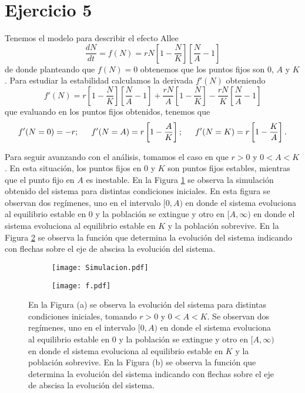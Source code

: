 \section*{Ejercicio 5}
\graphicspath{{Figuras/ej_06/}}

Tenemos el modelo para describir el efecto Allee
\begin{equation}
    \frac{dN}{dt} = f(N) = r N \left[ 1 - \frac{N}{K} \right] \left[ \frac{N}{A} -1 \right]
\end{equation}
de donde planteando que $f(N) = 0$ obtenemos que los puntos fijos son 0, $A$ y $K$. Para estudiar la estabilidad calculamos la derivada $f'(N)$ obteniendo
\begin{equation}
    f'(N) = r \left[ 1-\frac{N}{K} \right] \left[ \frac{N}{A} -1 \right] + \frac{rN}{A} \left[ 1 - \frac{N}{K} \right] - \frac{rN}{K} \left[ \frac{N}{A}-1\right]
\end{equation}
que evaluando en los puntos fijos obtenidos, tenemos que
\begin{equation}
    f'(N=0) = -r; \indent f'(N=A)=r\left[1-\frac{A}{K}\right]; \indent f'(N=K)=r\left[1-\frac{K}{A}\right]. 
\end{equation}

Para seguir avanzando con el análisis, tomamos el caso en que $r>0$ y $0<A<K$. En esta situación, los puntos fijos en $0$ y $K$ son puntos fijos estables, mientras que el punto fijo en $A$ es inestable. En la Figura \ref{06_Simulacion} se observa la simulación obtenido del sistema para distintas condiciones iniciales. En esta figura se observan dos regímenes, uno en el intervalo $[0,A)$ en donde el sistema evoluciona al equilibrio estable en $0$ y la población se extingue y otro en $[A,\infty)$ en donde el sistema evoluciona al equilibrio estable en $K$ y la población sobrevive. En la Figura \ref{06_Funcion_y_raices} se observa la función que determina la evolución del sistema indicando con flechas sobre el eje de abscisa la evolución del sistema.

\begin{figure}
    \centering
    \begin{subfigure}[b]{0.49\textwidth}
        \texttt{[image: Simulacion.pdf]}
        \caption{}
        \label{06_Simulacion}
    \end{subfigure}
    \begin{subfigure}[b]{0.49\textwidth}
        \texttt{[image: f.pdf]}
        \caption{}
        \label{06_Funcion_y_raices}
    \end{subfigure}
    \caption{En la Figura (a) se observa la evolución del sistema para distintas condiciones iniciales, tomando $r>0$ y $0<A<K$. Se observan dos regímenes, uno en el intervalo $[0,A)$ en donde el sistema evoluciona al equilibrio estable en $0$ y la población se extingue y otro en $[A,\infty)$ en donde el sistema evoluciona al equilibrio estable en $K$ y la población sobrevive. En la Figura (b) se observa la función que determina la evolución del sistema indicando con flechas sobre el eje de abscisa la evolución del sistema. }
    \label{06_ejercicio}
\end{figure}

